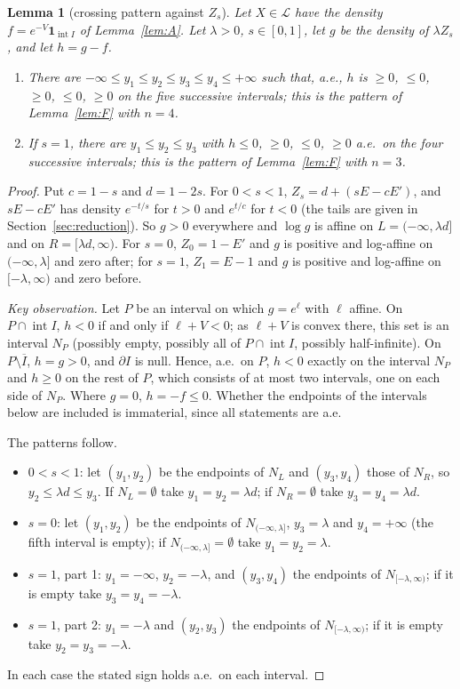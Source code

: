 \documentclass[11pt]{article}
\newtheorem{lemmaL}{Lemma}
\theoremstyle{remark}
\begin{document}
\begin{lemmaL}[crossing pattern against $Z_s$]\label{lem:G}
Let $X\in\mathcal L$ have the density $f=e^{-V}\mathbf 1_{\operatorname{int}I}$ of Lemma~\ref{lem:A}. Let $\lambda>0$, $s\in[0,1]$, let $g$ be the density of $\lambda Z_s$, and let $h=g-f$.
\begin{enumerate}
\item There are $-\infty\le y_1\le y_2\le y_3\le y_4\le+\infty$ such that, a.e., $h$ is $\ge0$, $\le0$, $\ge0$, $\le0$, $\ge0$ on the five successive intervals; this is the pattern of Lemma~\ref{lem:F} with $n=4$.
\item If $s=1$, there are $y_1\le y_2\le y_3$ with $h\le0$, $\ge0$, $\le0$, $\ge0$ a.e.\ on the four successive intervals; this is the pattern of Lemma~\ref{lem:F} with $n=3$.
\end{enumerate}
\end{lemmaL}
\begin{proof}
Put $c=1-s$ and $d=1-2s$. For $0<s<1$, $Z_s=d+(sE-cE')$, and $sE-cE'$ has density $e^{-t/s}$ for $t>0$ and $e^{t/c}$ for $t<0$ (the tails are given in Section~\ref{sec:reduction}). So $g>0$ everywhere and $\log g$ is affine on $L=(-\infty,\lambda d]$ and on $R=[\lambda d,\infty)$. For $s=0$, $Z_0=1-E'$ and $g$ is positive and log-affine on $(-\infty,\lambda]$ and zero after; for $s=1$, $Z_1=E-1$ and $g$ is positive and log-affine on $[-\lambda,\infty)$ and zero before.

\emph{Key observation.} Let $P$ be an interval on which $g=e^{\ell}$ with $\ell$ affine. On $P\cap\operatorname{int}I$, $h<0$ if and only if $\ell+V<0$; as $\ell+V$ is convex there, this set is an interval $N_P$ (possibly empty, possibly all of $P\cap\operatorname{int}I$, possibly half-infinite). On $P\setminus\overline I$, $h=g>0$, and $\partial I$ is null. Hence, a.e.\ on $P$, $h<0$ exactly on the interval $N_P$ and $h\ge0$ on the rest of $P$, which consists of at most two intervals, one on each side of $N_P$. Where $g=0$, $h=-f\le0$. Whether the endpoints of the intervals below are included is immaterial, since all statements are a.e.

The patterns follow.
\begin{itemize}
\item $0<s<1$: let $(y_1,y_2)$ be the endpoints of $N_L$ and $(y_3,y_4)$ those of $N_R$, so $y_2\le\lambda d\le y_3$. If $N_L=\emptyset$ take $y_1=y_2=\lambda d$; if $N_R=\emptyset$ take $y_3=y_4=\lambda d$.
\item $s=0$: let $(y_1,y_2)$ be the endpoints of $N_{(-\infty,\lambda]}$, $y_3=\lambda$ and $y_4=+\infty$ (the fifth interval is empty); if $N_{(-\infty,\lambda]}=\emptyset$ take $y_1=y_2=\lambda$.
\item $s=1$, part 1: $y_1=-\infty$, $y_2=-\lambda$, and $(y_3,y_4)$ the endpoints of $N_{[-\lambda,\infty)}$; if it is empty take $y_3=y_4=-\lambda$.
\item $s=1$, part 2: $y_1=-\lambda$ and $(y_2,y_3)$ the endpoints of $N_{[-\lambda,\infty)}$; if it is empty take $y_2=y_3=-\lambda$.
\end{itemize}
In each case the stated sign holds a.e.\ on each interval.
\end{proof}
\end{document}
